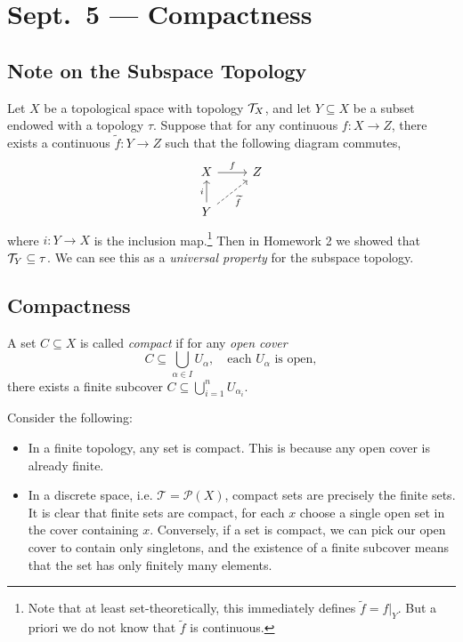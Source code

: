 \chapter{Sept.~5 --- Compactness}

\section{Note on the Subspace Topology}
\begin{remark}
  Let $X$ be a topological space with topology
  $\mathcal{T}_X$, and let $Y \subseteq X$ be a subset
  endowed with a topology $\tau$. Suppose that
  for any continuous $f : X \to Z$, there exists
  a continuous $\widetilde{f} : Y \to Z$
  such that the following diagram commutes,
  \[
    \begin{tikzcd}
      X \ar[r, "f"] & Z \\
      Y \ar[ur, "\widetilde{f}"', dashed] \ar[u, "i"] &
    \end{tikzcd}
  \]
  where $i : Y \to X$ is the inclusion map.\footnote{Note that at least set-theoretically, this immediately defines $\widetilde{f} = f|_Y$. But a priori we do not know that $\widetilde{f}$ is continuous.}
  Then in Homework 2 we showed that
  $\mathcal{T}_Y \subseteq \tau$. We can see this as a
  \emph{universal property} for the subspace topology.
\end{remark}

\section{Compactness}
\begin{definition}
  A set $C \subseteq X$ is called \emph{compact}
  if for any \emph{open cover}
  \[
    C \subseteq \bigcup_{\alpha \in I} U_\alpha,
    \quad
    \text{each $U_\alpha$ is open},
  \]
  there exists a finite subcover $C \subseteq \bigcup_{i = 1}^n U_{\alpha_i}$.
\end{definition}

\begin{example} Consider the following:
  \begin{itemize}
    \item In a finite topology, any set is compact.
      This is because any open cover is already finite.
    \item In a discrete space, i.e. $\mathcal{T} = \mathcal{P}(X)$,
      compact sets are precisely the finite sets.
      It is clear that finite sets are compact,
      for each $x$ choose a single open set in the cover
      containing $x$. Conversely, if a set is
      compact, we can pick our open
      cover to contain only singletons, and the
      existence of a
      finite subcover means that the set has
      only finitely many elements.
  \end{itemize}
\end{example}

